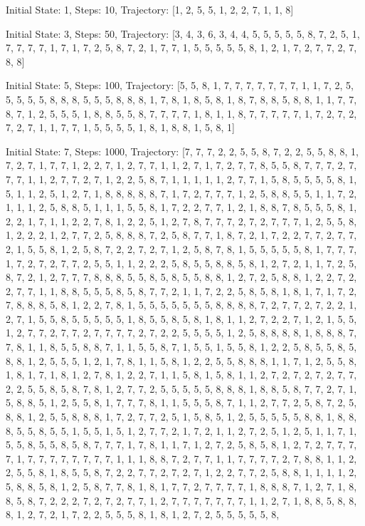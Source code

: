 \documentclass[12pt]{spbstu-task}
\begin{document}
{\small{}
Initial State: 1, Steps: 10, Trajectory: [1, 2, 5, 5, 1, 2, 2, 7, 1, 1, 8]

Initial State: 3, Steps: 50, Trajectory: [3, 4, 3, 6, 3, 4, 4, 5, 5, 5, 5, 5, 8, 7, 2, 5, 1, 7, 7, 7, 7, 1, 7, 1, 7, 2, 5, 8, 7, 2, 1, 7, 7, 1, 5, 5, 5, 5, 5, 8, 1, 2, 1, 7, 2, 7, 7, 2, 7, 8, 8]

Initial State: 5, Steps: 100, Trajectory: [5, 5, 8, 1, 7, 7, 7, 7, 7, 7, 7, 1, 1, 7, 2, 5, 5, 5, 5, 5, 8, 8, 8, 5, 5, 5, 8, 8, 8, 1, 7, 8, 1, 8, 5, 8, 1, 8, 7, 8, 8, 5, 8, 8, 1, 1, 7, 7, 8, 7, 1, 2, 5, 5, 5, 1, 8, 8, 5, 5, 8, 7, 7, 7, 7, 1, 8, 1, 1, 8, 7, 7, 7, 7, 7, 1, 7, 2, 7, 2, 7, 2, 7, 1, 1, 7, 7, 1, 5, 5, 5, 5, 1, 8, 1, 8, 8, 1, 5, 8, 1]

Initial State: 7, Steps: 1000, Trajectory: [7, 7, 7, 2, 2, 5, 5, 8, 7, 2, 2, 5, 5, 8, 8, 1, 7, 2, 7, 1, 7, 7, 1, 2, 2, 7, 1, 2, 7, 7, 1, 1, 2, 7, 1, 7, 2, 7, 7, 8, 5, 5, 8, 7, 7, 7, 2, 7, 7, 7, 1, 1, 2, 7, 7, 2, 7, 1, 2, 2, 5, 8, 7, 1, 1, 1, 1, 1, 2, 7, 7, 1, 5, 8, 5, 5, 5, 5, 8, 1, 5, 1, 1, 2, 5, 1, 2, 7, 1, 8, 8, 8, 8, 8, 7, 1, 7, 2, 7, 7, 7, 1, 2, 5, 8, 8, 5, 5, 1, 1, 7, 2, 1, 1, 1, 2, 5, 8, 8, 5, 1, 1, 1, 5, 5, 8, 1, 7, 2, 2, 7, 7, 1, 2, 1, 8, 8, 7, 8, 5, 5, 5, 8, 1, 2, 2, 1, 7, 1, 1, 2, 2, 7, 8, 1, 2, 2, 5, 1, 2, 7, 8, 7, 7, 7, 2, 7, 2, 7, 7, 7, 1, 2, 5, 5, 8, 1, 2, 2, 2, 1, 2, 7, 7, 2, 5, 8, 8, 8, 7, 2, 5, 8, 7, 7, 1, 8, 7, 2, 1, 7, 2, 2, 7, 7, 2, 7, 7, 2, 1, 5, 5, 8, 1, 2, 5, 8, 7, 2, 2, 7, 2, 7, 1, 2, 5, 8, 7, 8, 1, 5, 5, 5, 5, 5, 8, 1, 7, 7, 7, 1, 7, 2, 7, 2, 7, 7, 2, 5, 5, 1, 1, 2, 2, 2, 5, 8, 5, 5, 8, 8, 5, 8, 1, 2, 7, 2, 1, 1, 7, 2, 5, 8, 7, 2, 1, 2, 7, 7, 7, 8, 8, 8, 5, 5, 8, 5, 8, 5, 5, 8, 8, 1, 2, 7, 2, 5, 8, 8, 1, 2, 2, 7, 2, 2, 7, 7, 1, 1, 8, 8, 5, 5, 5, 8, 5, 8, 7, 7, 2, 1, 1, 7, 2, 2, 5, 8, 5, 8, 1, 8, 1, 7, 1, 7, 2, 7, 8, 8, 8, 5, 8, 1, 2, 2, 7, 8, 1, 5, 5, 5, 5, 5, 5, 5, 8, 8, 8, 8, 7, 2, 7, 7, 2, 7, 2, 2, 1, 2, 7, 1, 5, 5, 8, 5, 5, 5, 5, 5, 1, 8, 5, 5, 8, 5, 8, 1, 8, 1, 1, 2, 7, 2, 2, 7, 1, 2, 1, 5, 5, 1, 2, 7, 7, 2, 7, 7, 2, 7, 7, 7, 7, 2, 7, 2, 2, 5, 5, 5, 5, 1, 2, 5, 8, 8, 8, 8, 1, 8, 8, 8, 7, 7, 8, 1, 1, 8, 5, 5, 8, 8, 7, 1, 1, 5, 5, 8, 7, 1, 5, 5, 1, 5, 5, 8, 1, 2, 2, 5, 8, 5, 5, 8, 5, 8, 8, 1, 2, 5, 5, 5, 1, 2, 1, 7, 8, 1, 1, 5, 8, 1, 2, 2, 5, 5, 8, 8, 8, 1, 1, 7, 1, 2, 5, 5, 8, 1, 8, 1, 7, 1, 8, 1, 2, 7, 8, 1, 2, 2, 7, 1, 1, 5, 8, 1, 5, 8, 1, 1, 2, 7, 2, 7, 2, 7, 2, 7, 7, 2, 2, 5, 5, 8, 5, 8, 7, 8, 1, 2, 7, 7, 2, 5, 5, 5, 5, 5, 8, 8, 8, 1, 8, 8, 5, 8, 7, 7, 2, 7, 1, 5, 8, 8, 5, 1, 2, 5, 5, 8, 1, 7, 7, 7, 8, 1, 1, 5, 5, 5, 8, 7, 1, 1, 2, 7, 7, 2, 5, 8, 7, 2, 5, 8, 8, 1, 2, 5, 5, 8, 8, 8, 1, 7, 2, 7, 7, 2, 5, 1, 5, 8, 5, 1, 2, 5, 5, 5, 5, 5, 8, 8, 1, 8, 8, 8, 5, 5, 8, 5, 5, 1, 5, 5, 1, 5, 1, 2, 7, 7, 2, 1, 7, 2, 1, 1, 2, 7, 2, 5, 1, 2, 5, 1, 1, 7, 1, 5, 5, 8, 5, 5, 8, 5, 8, 7, 7, 7, 1, 7, 8, 1, 1, 7, 1, 2, 7, 2, 5, 8, 5, 8, 1, 2, 7, 2, 7, 7, 7, 7, 1, 7, 7, 7, 7, 7, 7, 7, 7, 1, 1, 1, 8, 8, 7, 2, 7, 7, 1, 1, 7, 7, 7, 7, 2, 7, 8, 8, 1, 1, 2, 2, 5, 5, 8, 1, 8, 5, 5, 8, 7, 2, 2, 7, 7, 2, 7, 2, 7, 1, 2, 2, 7, 7, 2, 5, 8, 8, 1, 1, 1, 1, 2, 5, 8, 8, 5, 8, 1, 2, 5, 8, 7, 7, 8, 1, 8, 1, 7, 7, 2, 7, 7, 7, 7, 1, 8, 8, 8, 7, 1, 2, 7, 1, 8, 8, 5, 8, 7, 2, 2, 2, 7, 2, 7, 2, 7, 7, 1, 2, 7, 7, 7, 7, 7, 7, 7, 1, 1, 2, 7, 1, 8, 8, 5, 8, 8, 8, 1, 2, 7, 2, 1, 7, 2, 2, 5, 5, 5, 8, 1, 8, 1, 2, 7, 2, 5, 5, 5, 5, 5, 8, }
\end{document}
